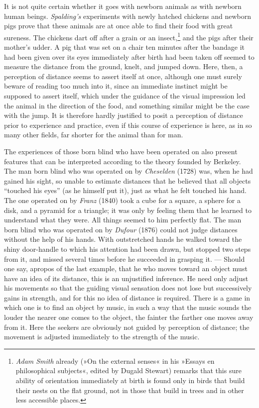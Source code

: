 \documentclass[12pt,a4paper]{book}
\newcommand{\opage}[1]{\marginnote{\footnotesize\textit{[#1]}}}
\begin{document}
It is not quite certain whether it goes with newborn animals as with
newborn human beings. \emph{Spalding's} experiments with newly hatched
chickens and newborn pigs prove that these animals are at once able to
find their food with great sureness. The chickens dart off after a grain
or an
insect,\footnote{\emph{Adam Smith} already (»On the external senses« in
his »Essays en philosophical subjects«, edited by Dugald Stewart)
remarks that this sure ability of orientation immediately at birth is
found only in birds that build their nests on the flat ground, not in
those that build in trees and in other less accessible places.} and the
pigs after their mother's udder. A pig that was set on a chair ten
minutes after the bandage it had been given over its eyes immediately
after birth had been taken off seemed to measure the distance from the
ground, knelt, and jumped down. Here, then, a perception of distance
seems to assert itself at once, although one must surely beware of
reading too much into it, since an immediate instinct might be supposed
to assert itself, which under the guidance of the visual impression led
the animal in the direction of the food, and something similar might be
the case with the jump. It is therefore hardly justified to posit a
perception of distance prior to experience and practice, even if this
course of experience is here, as in so many other fields, far shorter
for the animal than for man.

The experiences of those born blind who have been operated on also
present features that can be interpreted according to the theory founded
by Berkeley. The man born blind who was operated on by
\emph{Cheselden} (1728) was, when he had gained his sight, so unable to
estimate distances that he believed that all objects ``touched his
eyes'' (as he himself put it), just as what he felt touched his hand.
The one operated on by \emph{Franz} (1840) took a cube for a square, a
sphere for a disk, and a pyramid for a triangle; it was only by feeling
them that he learned to understand what they were. All things seemed to
him perfectly flat. The man born blind who was operated on by
\emph{Dufour} (1876) could not judge distances without the help of his
hands. With
\opage{240}outstretched hands he walked toward the shiny door-handle to
which his attention had been drawn, but stopped two steps from it, and
missed several times before he succeeded in grasping it. --- Should one
say, apropos of the last example, that he who moves toward an object must
have an idea of its distance, this is an unjustified inference. He need
only adjust his movements so that the guiding visual sensation does not
lose but successively gains in strength, and for this no idea of
distance is required. There is a game in which one is to find an object
by music, in such a way that the music sounds the louder the nearer one
comes to the object, the fainter the farther one moves away from it. Here
the seekers are obviously not guided by perception of distance; the
movement is adjusted immediately to the strength of the music.
\end{document}
